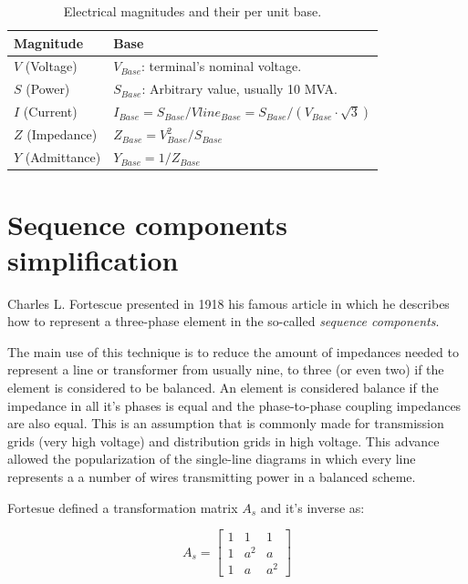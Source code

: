 \documentclass[nols,a4paper,twoside,notoc,fleqn]{tufte-book}
\begin{document}
\bigskip
\begin{table}[h!]
\begin{center}
\footnotesize
\begin{tabularx}{\textwidth}{lX}
\toprule
Magnitude &  Base\\
\midrule
$V$ (Voltage) & $V_{Base}$: terminal's nominal voltage. \\
$S$ (Power) & $S_{Base}$: Arbitrary value, usually 10 MVA. \\
$I$ (Current) & $I_{Base} = S_{Base} / Vline_{Base} = S_{Base} / (V_{Base} \cdot \sqrt{3})$ \\
$Z$ (Impedance) & $Z_{Base} = V_{Base}^2 / S_{Base}$ \\
$Y$ (Admittance) & $Y_{Base} = 1 / Z_{Base}$ \\
\bottomrule
\end{tabularx}
\end{center}
  \caption{Electrical magnitudes and their per unit base.}
  \label{magnitudes_and_their_base}
\end{table}


\section{Sequence components simplification}

Charles L. Fortescue presented in 1918 his famous article \cite{fortescue1918method} in which he describes how to represent a three-phase element in the so-called \textit{sequence components}.

The main use of this technique is to reduce the amount of impedances needed to represent a line or transformer from usually nine, to three (or even two) if the element is considered to be balanced. An element is considered balance if the impedance in all it's phases is equal and the phase-to-phase coupling impedances are also equal. This is an assumption that is commonly made for transmission grids (very high voltage) and distribution grids in high voltage. This advance allowed the popularization of the single-line diagrams in which every line represents a  a number of wires transmitting power in a balanced scheme.

Fortesue defined a transformation matrix $A_s$ and it's inverse as:

\begin{equation}
A_s = \left[ \begin{array}{ccc}
1 & 1 & 1 \\
1 & a^2 & a \\
1 & a & a^2
\end{array} \right]
\end{equation}
\end{document}
